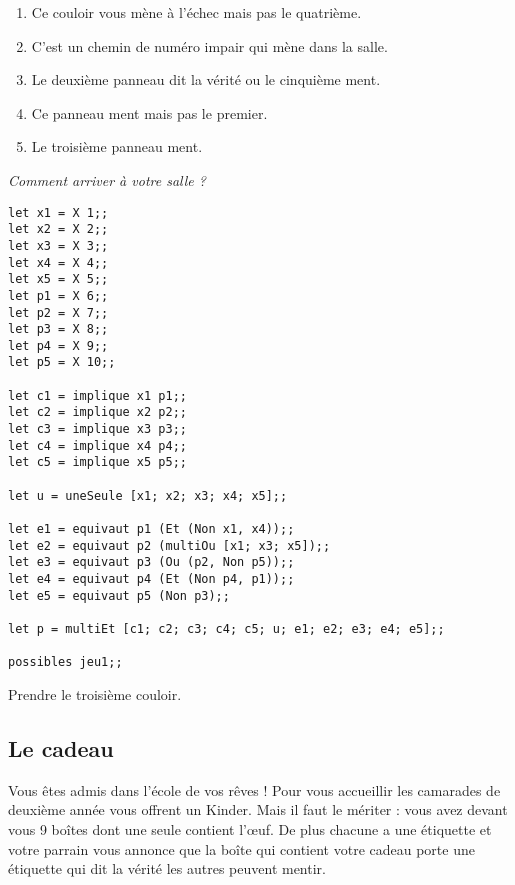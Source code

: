 \begin{enumerate}
\item Ce couloir vous mène à l'échec mais pas le quatrième.
\item C’est un chemin de numéro impair qui mène dans la salle.
\item Le deuxième panneau dit la vérité ou le cinquième ment.
\item Ce panneau ment mais pas le premier.
\item Le troisième panneau ment.
\end{enumerate}
\begin{Exercise}\it
Comment arriver à votre salle ?
\end{Exercise}
\begin{Answer}
\begin{lstlisting}
let x1 = X 1;;
let x2 = X 2;;
let x3 = X 3;;
let x4 = X 4;;
let x5 = X 5;;
let p1 = X 6;;
let p2 = X 7;;
let p3 = X 8;;
let p4 = X 9;;
let p5 = X 10;;

let c1 = implique x1 p1;;
let c2 = implique x2 p2;;
let c3 = implique x3 p3;;
let c4 = implique x4 p4;;
let c5 = implique x5 p5;;

let u = uneSeule [x1; x2; x3; x4; x5];;

let e1 = equivaut p1 (Et (Non x1, x4));;
let e2 = equivaut p2 (multiOu [x1; x3; x5]);;
let e3 = equivaut p3 (Ou (p2, Non p5));;
let e4 = equivaut p4 (Et (Non p4, p1));;
let e5 = equivaut p5 (Non p3);;

let p = multiEt [c1; c2; c3; c4; c5; u; e1; e2; e3; e4; e5];; 

possibles jeu1;;
\end{lstlisting}
Prendre le troisième couloir.
\newpage
\end{Answer}
\subsection{Le cadeau}
Vous êtes admis dans l'école de vos rêves ! Pour vous accueillir les camarades de deuxième année vous offrent un Kinder.
Mais il faut le mériter : vous avez devant vous 9 boîtes dont une seule contient l'œuf. De plus chacune a une étiquette et votre parrain vous annonce que la boîte qui contient votre cadeau porte une étiquette qui dit la vérité les autres peuvent mentir.

